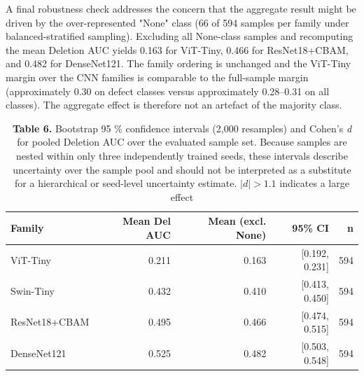 \documentclass[11pt,a4paper]{article}
\begin{document}
A final robustness check addresses the concern that the aggregate result might be driven by the over-represented "None" class (66 of 594 samples per family under balanced-stratified sampling). Excluding all None-class samples and recomputing the mean Deletion AUC yields 0.163 for ViT-Tiny, 0.466 for ResNet18+CBAM, and 0.482 for DenseNet121. The family ordering is unchanged and the ViT-Tiny margin over the CNN families is comparable to the full-sample margin (approximately 0.30 on defect classes versus approximately 0.28--0.31 on all classes). The aggregate effect is therefore not an artefact of the majority class.


\begin{table}[htbp]
\centering
\small
\caption{\textbf{Table 5.} Per-class Deletion AUC (lower = more faithful). ViT-Tiny is most faithful in 8/9 classes}
\end{table}

\begin{table}[htbp]
\centering
\small
\caption{\textbf{Table 6.} Bootstrap 95 \% confidence intervals (2,000 resamples) and Cohen's \emph{d} for pooled Deletion AUC over the evaluated sample set. Because samples are nested within only three independently trained seeds, these intervals describe uncertainty over the sample pool and should not be interpreted as a substitute for a hierarchical or seed-level uncertainty estimate. $|d| > 1.1$ indicates a large effect}
\begin{tabular}{lrrrr}
\toprule
Family & Mean Del AUC & Mean (excl. None) & 95\% CI & n \\
\midrule
ViT-Tiny & 0.211 & 0.163 & [0.192, 0.231] & 594 \\
Swin-Tiny & 0.432 & 0.410 & [0.413, 0.450] & 594 \\
ResNet18+CBAM & 0.495 & 0.466 & [0.474, 0.515] & 594 \\
DenseNet121 & 0.525 & 0.482 & [0.503, 0.548] & 594 \\
\bottomrule
\end{tabular}
\end{table}
\end{document}
